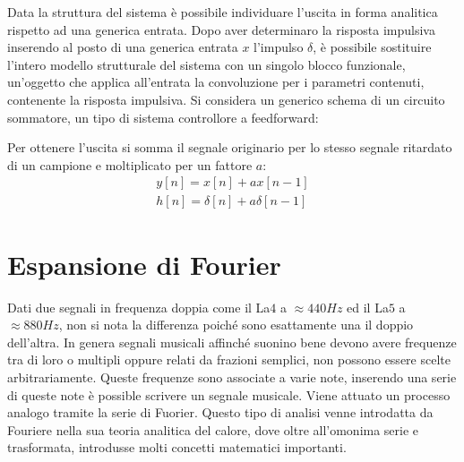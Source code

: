 \documentclass{article}
\numberwithin{equation}{subsection}
\begin{document}
Data la struttura del sistema è possibile individuare l'uscita in forma analitica rispetto ad una generica entrata. Dopo aver determinaro la risposta impulsiva inserendo 
al posto di una generica entrata $x$ l'impulso $\delta$, è possibile sostituire l'intero modello strutturale del sistema con un singolo blocco funzionale, un'oggetto che 
applica all'entrata la convoluzione per i parametri contenuti, contenente la risposta impulsiva.  
Si considera un generico schema di un circuito sommatore, un tipo di sistema controllore a feedforward:
\begin{center}
\end{center}
Per ottenere l'uscita si somma il segnale originario per lo stesso segnale ritardato di un campione e moltiplicato per un fattore $a$:
\begin{gather*}
    y[n]=x[n]+ax[n-1]\\
    h[n]=\delta[n]+a\delta[n-1]
\end{gather*}
\begin{center}
\end{center}

\clearpage

\section{Espansione di Fourier}

Dati due segnali in frequenza doppia come il La$4$ a $\approx 440Hz$ ed il La$5$ a $\approx 880Hz$, non si nota la differenza poiché sono esattamente una il doppio dell'altra. 
In genera segnali musicali affinché suonino bene devono avere frequenze tra di loro o multipli oppure relati da frazioni semplici, non possono essere scelte arbitrariamente. 
Queste frequenze sono associate a varie note, inserendo una serie di queste note è possible scrivere un segnale musicale. Viene attuato un processo analogo tramite la serie di 
Fuorier. Questo tipo di analisi venne introdatta da Fouriere nella sua teoria analitica del calore, dove oltre all'omonima serie e trasformata, introdusse molti concetti 
matematici importanti. 
\end{document}
